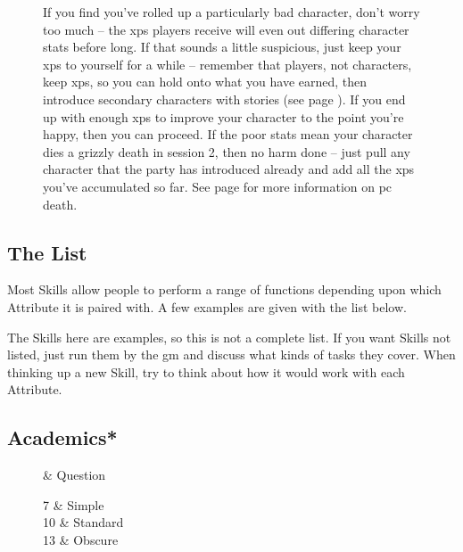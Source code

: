 \begin{multicols}{2}
{\begin{figure*}[b]
\begin{tcolorbox}[title=Rolling with Bad Stats]
			If you find you've rolled up a particularly bad character, don't worry too much -- the \glspl{xp} players receive will even out differing character stats before long.
			If that sounds a little suspicious, just keep your \glspl{xp} to yourself for a while -- remember that players, not characters, keep \glspl{xp}, so you can hold onto what you have earned, then introduce secondary characters with stories (see page \pageref{stories}).
			If you end up with enough \glspl{xp} to improve your character to the point you're happy, then you can proceed.
			If the poor stats mean your character dies a grizzly death in session 2, then no harm done -- just pull any character that the party has introduced already and add all the \glspl{xp} you've accumulated so far.
			See page \pageref{pcdeath} for more information on \gls{pc} death.

		\end{tcolorbox}
	\end{figure*}

}{}

\label{skills}
\subsection{The List}

Most Skills allow people to perform a range of functions depending upon which Attribute it is paired with. A few examples are given with the list below.

The Skills here are examples, so this is not a complete list.
If you want Skills not listed, just run them by the \gls{gm} and discuss what kinds of tasks they cover.
When thinking up a new Skill, try to think about how it would work with each Attribute.

\subsection{Academics*}

\begin{wrapfigure}{R}{.2\textwidth} 

	\begin{rollchart}

		 & Question \\\hline

		7 & Simple \\

		10 & Standard \\

		13 & Obscure \\


\end{rollchart}
\end{wrapfigure}
\end{multicols}
